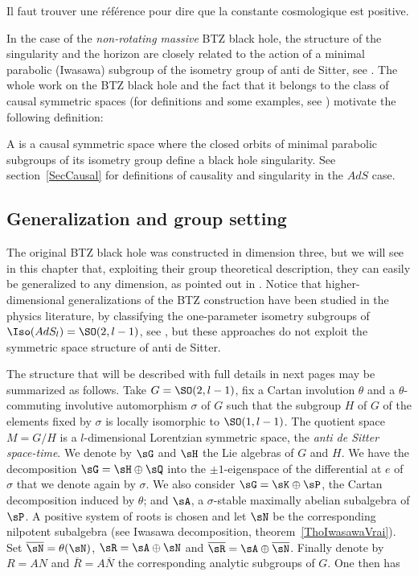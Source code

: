 \begin{probleme}
Il faut trouver une référence pour dire que la constante cosmologique est positive.
\end{probleme}

In the case of the \emph{non-rotating massive} BTZ black hole, the structure of the singularity and the horizon are closely related to the action of a minimal parabolic (Iwasawa) subgroup of the isometry group of anti de Sitter, see \cite{BTZB_deux,Keio}. The whole work on the BTZ black hole and the fact that it belongs to the class of causal symmetric spaces (for definitions and some examples, see \cite{HilgertOlaf}) motivate the following definition:

\begin{definition}
A  is a causal symmetric space where the closed orbits of minimal parabolic subgroups of its isometry group define a black hole singularity. See section~\ref{SecCausal} for definitions of causality and singularity in the $AdS$ case.
\label{Def1}
\end{definition}

\subsection{Generalization and group setting}
\label{SubSecGEneBHGrop}


The original BTZ black hole was constructed in dimension three, but we will see in this chapter that, exploiting their group theoretical description, they can easily be generalized to any dimension, as pointed out in \cite{BDRS,lcTNAdS}.  Notice that higher-dimensional generalizations of the BTZ construction have been studied in the physics literature, by classifying the one-parameter isometry subgroups of $\Iso(AdS_l)=\SO(2,l-1)$, see \cite{Figueroa,AdSBH,Madden,BanadosIQxXuEh,Aminneborg,HolstPeldan}, but these approaches do not exploit the symmetric space structure of anti de Sitter.

The structure that will be described with full details in next pages may be summarized as follows. Take $G=\SO(2,l-1)$, fix a Cartan involution $\theta$ and a $\theta$-commuting involutive automorphism $\sigma$ of $G$ such that the subgroup $H$ of $G$ of the elements fixed by $\sigma$ is locally isomorphic to $\SO(1,l-1)$. The quotient space $M=G/H$ is a $l$-dimensional Lorentzian symmetric space, the {\sl anti de Sitter space-time}.  We denote by $\sG$ and $\sH$ the Lie algebras of $G$ and $H$. We have the decomposition $\sG=\sH\oplus\sQ$ into the $\pm 1$-eigenspace  of the differential at $e$ of $\sigma$ that we denote again by $\sigma$.  We also consider $\sG=\sK\oplus\sP$, the Cartan decomposition induced by $\theta$; and $\sA$, a $\sigma$-stable maximally abelian subalgebra of $\sP$. A positive system of roots is chosen  and let $\sN$ be the corresponding nilpotent subalgebra (see Iwasawa decomposition, theorem~\ref{ThoIwasawaVrai}).  Set  $\overline{\sN}=\theta(\sN)$, $\sR=\sA\oplus\sN$ and $\overline{\sR}=\sA\oplus\overline{\sN}$. Finally denote by $R=AN$ and $\overline{R}=A\overline{N}$ the corresponding analytic subgroups of $G$.  One then has

